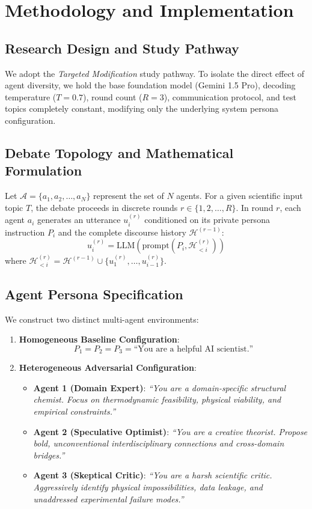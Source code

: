 \documentclass[conference,onecolumn]{IEEEtran}
\begin{document}
\section{Methodology and Implementation}

\subsection{Research Design and Study Pathway}
We adopt the \textit{Targeted Modification} study pathway. To isolate the direct effect of agent diversity, we hold the base foundation model (Gemini 1.5 Pro), decoding temperature ($T = 0.7$), round count ($R = 3$), communication protocol, and test topics completely constant, modifying only the underlying system persona configuration.

\subsection{Debate Topology and Mathematical Formulation}
Let $\mathcal{A} = \{a_1, a_2, \dots, a_N\}$ represent the set of $N$ agents. For a given scientific input topic $T$, the debate proceeds in discrete rounds $r \in \{1, 2, \dots, R\}$. In round $r$, each agent $a_i$ generates an utterance $u_{i}^{(r)}$ conditioned on its private persona instruction $P_i$ and the complete discourse history $\mathcal{H}^{(r-1)}$:
\begin{equation}
    u_{i}^{(r)} = \mathrm{LLM}\left(\text{prompt}(P_i, \mathcal{H}_{<i}^{(r)})\right)
\end{equation}
where $\mathcal{H}_{<i}^{(r)} = \mathcal{H}^{(r-1)} \cup \{u_{1}^{(r)}, \dots, u_{i-1}^{(r)}\}$.

\subsection{Agent Persona Specification}
We construct two distinct multi-agent environments:
\begin{enumerate}
    \item \textbf{Homogeneous Baseline Configuration}:
    \begin{equation}
        P_1 = P_2 = P_3 = \text{``You are a helpful AI scientist.''}
    \end{equation}
    \item \textbf{Heterogeneous Adversarial Configuration}:
    \begin{itemize}
        \item \textbf{Agent 1 (Domain Expert)}: \textit{``You are a domain-specific structural chemist. Focus on thermodynamic feasibility, physical viability, and empirical constraints.''}
        \item \textbf{Agent 2 (Speculative Optimist)}: \textit{``You are a creative theorist. Propose bold, unconventional interdisciplinary connections and cross-domain bridges.''}
        \item \textbf{Agent 3 (Skeptical Critic)}: \textit{``You are a harsh scientific critic. Aggressively identify physical impossibilities, data leakage, and unaddressed experimental failure modes.''}
    \end{itemize}
\end{enumerate}
\end{document}
